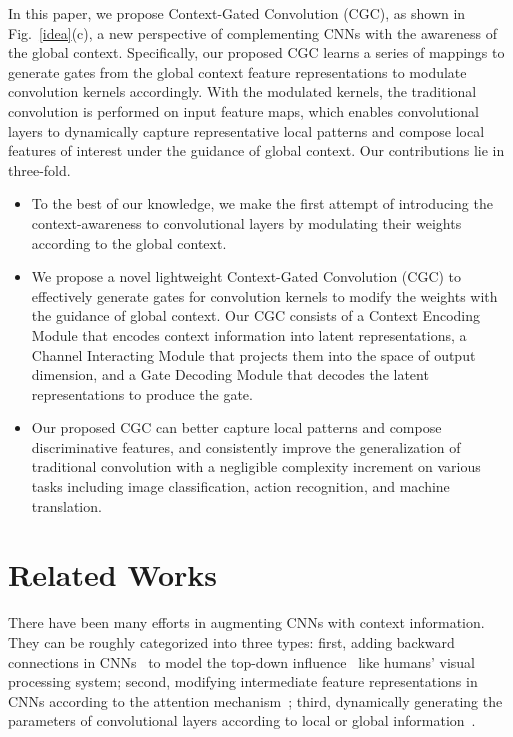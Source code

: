 \documentclass[runningheads]{llncs}
\begin{document}
In this paper, we propose Context-Gated Convolution (CGC), as shown in Fig.~\ref{idea}(c), a new perspective of complementing CNNs with the awareness of the global context. Specifically, our proposed CGC learns a series of mappings to generate gates from the global context feature representations to modulate convolution kernels accordingly. With the modulated kernels, the traditional convolution is performed on input feature maps, which enables convolutional layers to dynamically capture representative local patterns and compose local features of interest under the guidance of global context. Our contributions lie in three-fold.
\begin{itemize}
    \item To the best of our knowledge, we make the first attempt of introducing the context-awareness to convolutional layers by modulating their weights according to the global context.
    
    \item We propose a novel lightweight Context-Gated Convolution (CGC) to effectively generate gates for convolution kernels to modify the weights with the guidance of global context. Our CGC consists of a Context Encoding Module that encodes context information into latent representations, a Channel Interacting Module that projects them into the space of output dimension, and a Gate Decoding Module that decodes the latent representations to produce the gate.
    
    \item Our proposed CGC can better capture local patterns and compose discriminative features, and consistently improve the generalization of traditional convolution with a negligible complexity increment on various tasks including image classification, action recognition, and machine translation.
\end{itemize}

\section{Related Works}
There have been many efforts in augmenting CNNs with context information. They can be roughly categorized into three types: first, adding backward connections in CNNs~\cite{stollenga2014deep,zamir2017feedback,yang2018convolutional} to model the top-down influence~\cite{gilbert2013top} like humans' visual processing system; second, modifying intermediate feature representations in CNNs according to the attention mechanism~\cite{vaswani2017attention,wang2017non,woo2018cbam,chen2019graph,cao2019gcnet}; third, dynamically generating the parameters of convolutional layers according to local or global information~\cite{jia2016dynamic,dai2017deformable,wu2019pay,zhu2019deformable,jo2018deep,mildenhall2018burst,cheng2018dual}.
\end{document}
